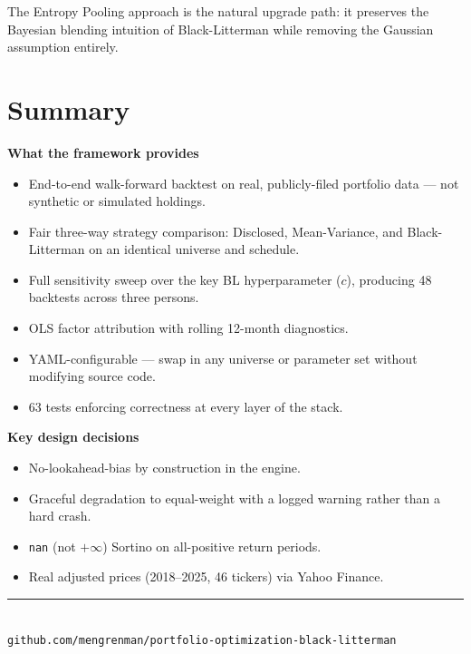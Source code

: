 \documentclass[11pt, a4paper]{article}
\newcommand{\code}[1]{\texttt{#1}}
\begin{document}
The Entropy Pooling approach is the natural upgrade path: it preserves the
Bayesian blending intuition of Black-Litterman while removing the Gaussian
assumption entirely.

\section{Summary}

\begin{notebox}
\textbf{What the framework provides}
\begin{itemize}
  \item End-to-end walk-forward backtest on real, publicly-filed portfolio data
        --- not synthetic or simulated holdings.
  \item Fair three-way strategy comparison: Disclosed, Mean-Variance,
        and Black-Litterman on an identical universe and schedule.
  \item Full sensitivity sweep over the key BL hyperparameter ($c$),
        producing 48 backtests across three persons.
  \item OLS factor attribution with rolling 12-month diagnostics.
  \item YAML-configurable --- swap in any universe or parameter set without
        modifying source code.
  \item 63 tests enforcing correctness at every layer of the stack.
\end{itemize}

\textbf{Key design decisions}
\begin{itemize}
  \item No-lookahead-bias by construction in the engine.
  \item Graceful degradation to equal-weight with a logged warning rather
        than a hard crash.
  \item \code{nan} (not $+\infty$) Sortino on all-positive return periods.
  \item Real adjusted prices (2018--2025, 46 tickers) via Yahoo Finance.
\end{itemize}
\end{notebox}

\vspace{12pt}
\begin{center}
  \textcolor{blnavy!40}{\rule{0.7\linewidth}{0.4pt}}\\[4pt]
  \small\textcolor{blnavy!60}{%
    \texttt{github.com/mengrenman/portfolio-optimization-black-litterman}}
\end{center}

\end{document}
